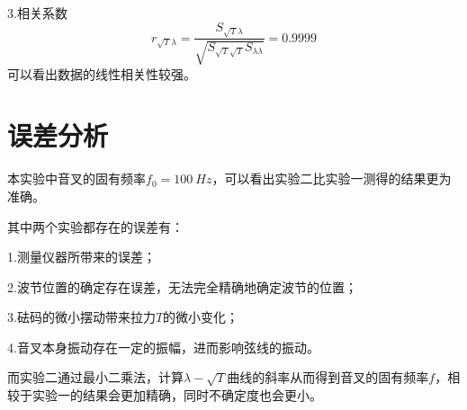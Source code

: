\documentclass{article}
\begin{document}
3.相关系数
$$
r_{\sqrt{T}\lambda}=\frac{S_{\sqrt{T}{\lambda}}}{\sqrt{S_{\sqrt{T}\sqrt{T}}S_{\lambda\lambda}}}=0.9999
$$
可以看出数据的线性相关性较强。

\section{误差分析}
本实验中音叉的固有频率$f_0=100\ Hz$，可以看出实验二比实验一测得的结果更为准确。

其中两个实验都存在的误差有：

1.测量仪器所带来的误差；

2.波节位置的确定存在误差，无法完全精确地确定波节的位置；

3.砝码的微小摆动带来拉力$T$的微小变化；

4.音叉本身振动存在一定的振幅，进而影响弦线的振动。

而实验二通过最小二乘法，计算$\lambda-\sqrt{T}$曲线的斜率从而得到音叉的固有频率$f$，相较于实验一的结果会更加精确，同时不确定度也会更小。
\end{document}
